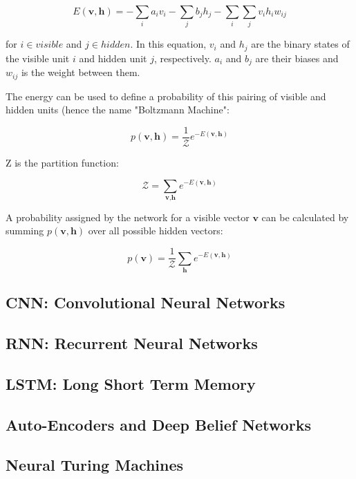 \begin{equation}
E(\textbf{v},\textbf{h}) = - \sum_{i} a_{i} v_{i} -\sum_{j} b_{j} h_{j} - \sum_{i}\sum_{j}v_{i}h_{i}w_{ij}
\end{equation}

for $i \in visible$ and $j \in hidden$. In this equation, $v_{i}$ and $h_{j}$ are the binary states of the visible unit $i$ and hidden unit $j$, respectively. $a_{i}$ and $b_{j}$ are their biases and $w_{ij}$ is the weight between them. 

The energy can be used to define a probability of this pairing of visible and hidden units (hence the name "Boltzmann Machine":

\begin{equation}
p(\textbf{v},\textbf{h}) = \frac{1}{\mathcal{Z}} e^{-E(\textbf{v},\textbf{h})}
\end{equation}

Z is the partition function:

\begin{equation}
\mathcal{Z} = \sum_{\textbf{v},\textbf{h}} e^{-E(\textbf{v},\textbf{h})}
\end{equation}

A probability assigned by the network for a visible vector $\textbf{v}$ can be calculated by summing $p(\textbf{v},\textbf{h})$ over all possible hidden vectors:

\begin{equation}
p(\textbf{v}) = \frac{1}{\mathcal{Z}} \sum_{\textbf{h}} e^{-E(\textbf{v},\textbf{h})}
\end{equation}

\subsection{CNN: Convolutional Neural Networks}

\subsection{RNN: Recurrent Neural Networks}

\subsection{LSTM: Long Short Term Memory}

\subsection{Auto-Encoders and Deep Belief Networks}

\subsection{Neural Turing Machines}
